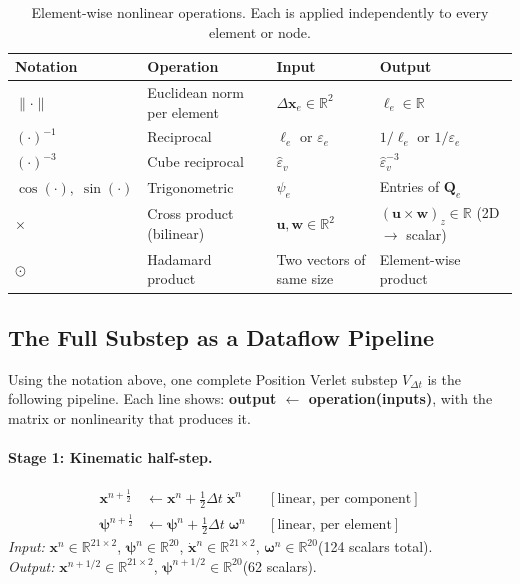 \documentclass[11pt]{article}
\newcommand{\vect}[1]{\mathbf{#1}}
\newcommand{\mat}[1]{\mathbf{#1}}
\newcommand{\Real}{\mathbb{R}}
\begin{document}
\begin{table}[H]
  \centering
  \renewcommand{\arraystretch}{1.3}
  \begin{tabular}{llll}
    \toprule
    Notation & Operation & Input & Output \\
    \midrule
    $\|\cdot\|$ & Euclidean norm per element & $\Delta\vect{x}_e \in \Real^2$ & $\ell_e \in \Real$ \\
    $(\cdot)^{-1}$ & Reciprocal & $\ell_e$ or $\varepsilon_e$ & $1/\ell_e$ or $1/\varepsilon_e$ \\
    $(\cdot)^{-3}$ & Cube reciprocal & $\hat{\varepsilon}_v$ & $\hat{\varepsilon}_v^{-3}$ \\
    $\cos(\cdot),\;\sin(\cdot)$ & Trigonometric & $\psi_e$ & Entries of $\mat{Q}_e$ \\
    $\times$ & Cross product (bilinear) & $\vect{u}, \vect{w} \in \Real^2$ & $(\vect{u} \times \vect{w})_z \in \Real$ (2D $\to$ scalar) \\
    $\odot$ & Hadamard product & Two vectors of same size & Element-wise product \\
    \bottomrule
  \end{tabular}
  \caption{Element-wise nonlinear operations.  Each is applied independently to every element or node.}
  \label{tab:nonlinear-ops}
\end{table}

\subsection{The Full Substep as a Dataflow Pipeline}
\label{sec:dataflow}

Using the notation above, one complete Position Verlet substep $V_{\Delta t}$ is the following pipeline.
Each line shows: \textbf{output $\leftarrow$ operation(inputs)}, with the matrix or nonlinearity that produces it.

\paragraph{Stage 1: Kinematic half-step.}
\begin{equation}
  \boxed{\;
  \begin{aligned}
    \vect{x}^{n+\frac{1}{2}} &\leftarrow \vect{x}^n + \tfrac{1}{2}\Delta t\;\dot{\vect{x}}^n
      && [\text{linear, per component}] \\
    \bm{\psi}^{n+\frac{1}{2}} &\leftarrow \bm{\psi}^n + \tfrac{1}{2}\Delta t\;\bm{\omega}^n
      && [\text{linear, per element}]
  \end{aligned}
  \;}
  \label{eq:mat-stage1}
\end{equation}
\textit{Input:} $\vect{x}^n \in \Real^{21 \times 2}$, $\bm{\psi}^n \in \Real^{20}$, $\dot{\vect{x}}^n \in \Real^{21 \times 2}$, $\bm{\omega}^n \in \Real^{20}$\quad (124 scalars total). \\
\textit{Output:} $\vect{x}^{n+1/2} \in \Real^{21 \times 2}$, $\bm{\psi}^{n+1/2} \in \Real^{20}$\quad (62 scalars).
\end{document}
